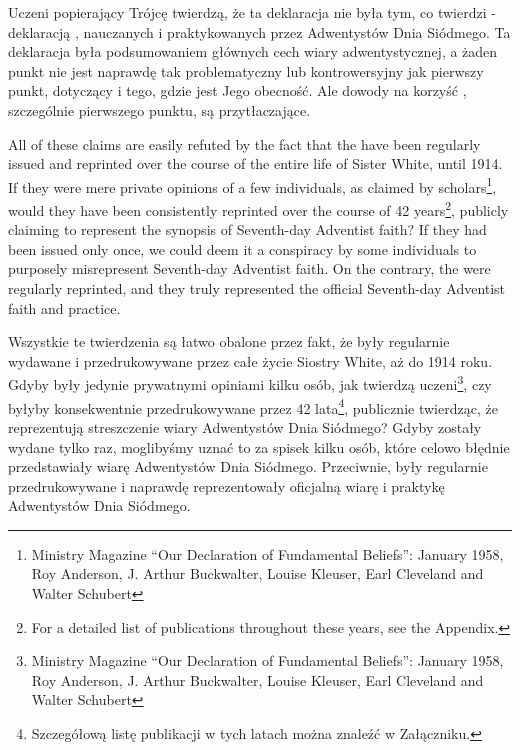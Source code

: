 Uczeni popierający Trójcę twierdzą, że ta deklaracja nie była tym, co twierdzi - deklaracją , nauczanych i praktykowanych przez Adwentystów Dnia Siódmego. Ta deklaracja była podsumowaniem głównych cech wiary adwentystycznej, a żaden punkt nie jest naprawdę tak problematyczny lub kontrowersyjny jak pierwszy punkt, dotyczący  i tego, gdzie jest Jego obecność. Ale dowody na korzyść , szczególnie pierwszego punktu, są przytłaczające.


All of these claims are easily refuted by the fact that the  have been regularly issued and reprinted over the course of the entire life of Sister White, until 1914. If they were mere private opinions of a few individuals, as claimed by scholars\footnote{Ministry Magazine “Our Declaration of Fundamental Beliefs”: January 1958, Roy Anderson, J. Arthur Buckwalter, Louise Kleuser, Earl Cleveland and Walter Schubert}, would they have been consistently reprinted over the course of 42 years\footnote{For a detailed list of publications throughout these years, see the Appendix.}, publicly claiming to represent the synopsis of Seventh-day Adventist faith? If they had been issued only once, we could deem it a conspiracy by some individuals to purposely misrepresent Seventh-day Adventist faith. On the contrary, the  were regularly reprinted, and they truly represented the official Seventh-day Adventist faith and practice.


Wszystkie te twierdzenia są łatwo obalone przez fakt, że  były regularnie wydawane i przedrukowywane przez całe życie Siostry White, aż do 1914 roku. Gdyby były jedynie prywatnymi opiniami kilku osób, jak twierdzą uczeni\footnote{Ministry Magazine “Our Declaration of Fundamental Beliefs”: January 1958, Roy Anderson, J. Arthur Buckwalter, Louise Kleuser, Earl Cleveland and Walter Schubert}, czy byłyby konsekwentnie przedrukowywane przez 42 lata\footnote{Szczegółową listę publikacji w tych latach można znaleźć w Załączniku.}, publicznie twierdząc, że reprezentują streszczenie wiary Adwentystów Dnia Siódmego? Gdyby zostały wydane tylko raz, moglibyśmy uznać to za spisek kilku osób, które celowo błędnie przedstawiały wiarę Adwentystów Dnia Siódmego. Przeciwnie,  były regularnie przedrukowywane i naprawdę reprezentowały oficjalną wiarę i praktykę Adwentystów Dnia Siódmego.


